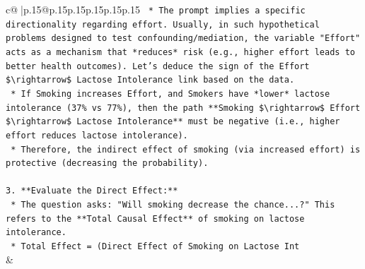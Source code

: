 \documentclass{article}
\begin{document}
{\begin{supertabular}{c@{$\;$}|p{.15\linewidth}@{}p{.15\linewidth}p{.15\linewidth}p{.15\linewidth}p{.15\linewidth}p{.15\linewidth}}
{{{\texttt{    *   The prompt implies a specific directionality regarding effort. Usually, in such hypothetical problems designed to test confounding/mediation, the variable "Effort" acts as a mechanism that *reduces* risk (e.g., higher effort leads to better health outcomes). Let's deduce the sign of the Effort \$\textbackslash{}rightarrow\$ Lactose Intolerance link based on the data.} \\
\texttt{    *   If Smoking increases Effort, and Smokers have *lower* lactose intolerance (37\% vs 77\%), then the path **Smoking \$\textbackslash{}rightarrow\$ Effort \$\textbackslash{}rightarrow\$ Lactose Intolerance** must be negative (i.e., higher effort reduces lactose intolerance).} \\
\texttt{    *   Therefore, the indirect effect of smoking (via increased effort) is protective (decreasing the probability).} \\
\\ 
\texttt{3.  **Evaluate the Direct Effect:**} \\
\texttt{    *   The question asks: "Will smoking decrease the chance...?" This refers to the **Total Causal Effect** of smoking on lactose intolerance.} \\
\texttt{    *   Total Effect = (Direct Effect of Smoking on Lactose Int} \\
            }
        }
    }
    & \\ \\


\end{supertabular}}
\end{document}
